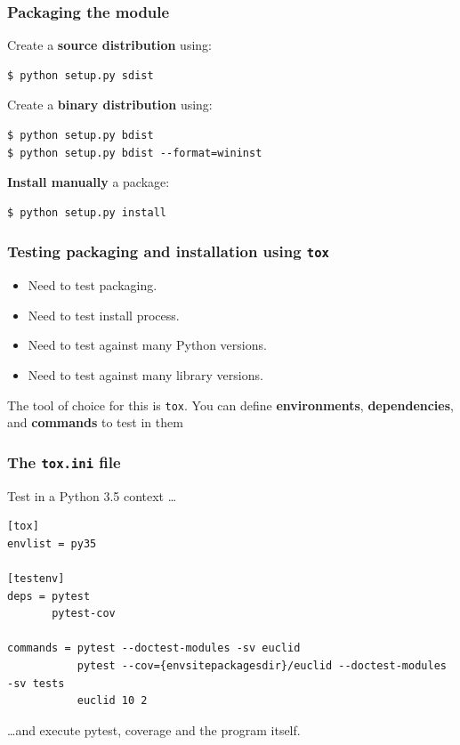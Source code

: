 \documentclass{beamer} %
\newcommand\emc[1]{\textcolor{brightblue}{\textbf{#1}}}
\begin{document}
\begin{frame}[fragile]

\frametitle{Packaging the module}

Create a \emc{source distribution} using:
\begin{verbatim}
$ python setup.py sdist
\end{verbatim}

\vspace{3mm}
Create a \emc{binary distribution} using:
\begin{verbatim}
$ python setup.py bdist
$ python setup.py bdist --format=wininst
\end{verbatim}

\vspace{3mm}
\emc{Install manually} a package:
\begin{verbatim}
$ python setup.py install
\end{verbatim}

\end{frame}

\begin{frame}

\frametitle{Testing packaging and installation using \texttt{tox}}

\begin{itemize}
  \item Need to test packaging.
  \item Need to test install process.
  \item Need to test against many Python versions.
  \item Need to test against many library versions.
  \end{itemize}

  \vspace{5mm}
  The tool of choice for this is \texttt{tox}. You can define \emc{environments}, \emc{dependencies}, and \emc{commands} to test in them

\end{frame}

\begin{frame}[fragile]

\frametitle{The \texttt{tox.ini} file}

Test in a Python 3.5 context \ldots 
\begin{scriptsize}
\begin{verbatim}
[tox]
envlist = py35

[testenv]
deps = pytest
       pytest-cov

commands = pytest --doctest-modules -sv euclid
           pytest --cov={envsitepackagesdir}/euclid --doctest-modules -sv tests
           euclid 10 2
\end{verbatim}
\end{scriptsize}
\ldots and execute pytest, coverage and the program itself.

\end{frame}
\end{document}
